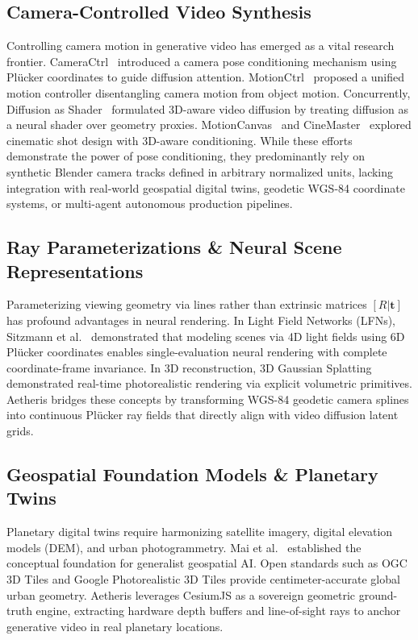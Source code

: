 \documentclass[10pt,twocolumn,letterpaper]{article}
\begin{document}
\subsection{Camera-Controlled Video Synthesis}
Controlling camera motion in generative video has emerged as a vital research frontier. CameraCtrl~\cite{he2024cameractrl} introduced a camera pose conditioning mechanism using Pl\"ucker coordinates to guide diffusion attention. MotionCtrl~\cite{wang2024motionctrl} proposed a unified motion controller disentangling camera motion from object motion. Concurrently, Diffusion as Shader~\cite{xu2025diffusion} formulated 3D-aware video diffusion by treating diffusion as a neural shader over geometry proxies. MotionCanvas~\cite{zhou2025motioncanvas} and CineMaster~\cite{zhu2025cinemaster} explored cinematic shot design with 3D-aware conditioning. While these efforts demonstrate the power of pose conditioning, they predominantly rely on synthetic Blender camera tracks defined in arbitrary normalized units, lacking integration with real-world geospatial digital twins, geodetic WGS-84 coordinate systems, or multi-agent autonomous production pipelines.

\subsection{Ray Parameterizations \& Neural Scene Representations}
Parameterizing viewing geometry via lines rather than extrinsic matrices $[R | \mathbf{t}]$ has profound advantages in neural rendering. In Light Field Networks (LFNs), Sitzmann et al.~\cite{sitzmann2021light} demonstrated that modeling scenes via 4D light fields using 6D Pl\"ucker coordinates enables single-evaluation neural rendering with complete coordinate-frame invariance. In 3D reconstruction, 3D Gaussian Splatting~\cite{kerbl2023gaussian} demonstrated real-time photorealistic rendering via explicit volumetric primitives. Aetheris bridges these concepts by transforming WGS-84 geodetic camera splines into continuous Pl\"ucker ray fields that directly align with video diffusion latent grids.

\subsection{Geospatial Foundation Models \& Planetary Twins}
Planetary digital twins require harmonizing satellite imagery, digital elevation models (DEM), and urban photogrammetry. Mai et al.~\cite{mai2024foundation} established the conceptual foundation for generalist geospatial AI. Open standards such as OGC 3D Tiles and Google Photorealistic 3D Tiles provide centimeter-accurate global urban geometry. Aetheris leverages CesiumJS as a sovereign geometric ground-truth engine, extracting hardware depth buffers and line-of-sight rays to anchor generative video in real planetary locations.
\end{document}
